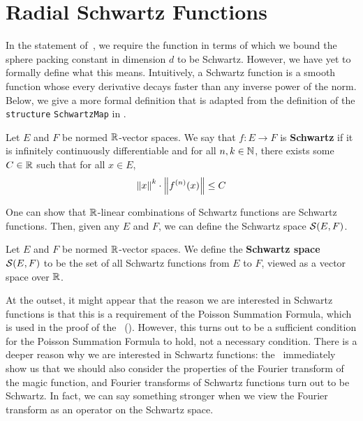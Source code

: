 \section{Radial Schwartz Functions}

In the statement of~, we require the function in terms of which we bound the sphere packing constant in dimension $d$ to be Schwartz. However, we have yet to formally define what this means. Intuitively, a Schwartz function is a smooth function whose every derivative decays faster than any inverse power of the norm. Below, we give a more formal definition that is adapted from the definition of the \verb|structure| \verb|SchwartzMap| in \mathlib.

\begin{boxdefinition}
    Let $E$ and $F$ be normed $\mathbb{R}$-vector spaces. We say that $f : E \to F$ is \textbf{Schwartz} if it is infinitely continuously differentiable and for all $n, k \in \mathbb{N}$, there exists some $C \in \mathbb{R}$ such that for all $x \in E$,
    \begin{align}
        \left\lVert x \right\rVert^k \cdot \left\lVert f^{(n)}(x) \right\rVert \leq C
        \label{Ch3:Eq:SchwartzDecayProperty}
    \end{align}
\end{boxdefinition}

One can show that $\mathbb{R}$-linear combinations of Schwartz functions are Schwartz functions. Then, given any $E$ and $F$, we can define the Schwartz space $\mathcal{S}(E, F)$.

\begin{boxdefinition}
    Let $E$ and $F$ be normed $\mathbb{R}$-vector spaces. We define the \textbf{Schwartz space} $\mathcal{S}(E, F)$ to be the set of all Schwartz functions from $E$ to $F$, viewed as a vector space over $\mathbb{R}$.
\end{boxdefinition}

At the outset, it might appear that the reason we are interested in Schwartz functions is that this is a requirement of the Poisson Summation Formula, which is used in the proof of the \CELP\ (). However, this turns out to be a sufficient condition for the Poisson Summation Formula to hold, not a necessary condition. There is a deeper reason why we are interested in Schwartz functions: the \CEC\ immediately show us that we should also consider the properties of the Fourier transform of the magic function, and Fourier transforms of Schwartz functions turn out to be Schwartz. In fact, we can say something stronger when we view the Fourier transform as an operator on the Schwartz space.

